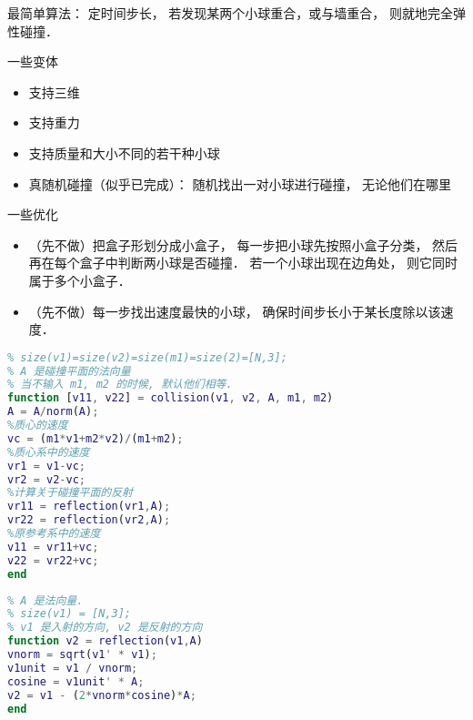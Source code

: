 
\begin{issues}
\issueDraft
\end{issues}


最简单算法： 定时间步长， 若发现某两个小球重合，或与墙重合， 则就地完全弹性碰撞．

一些变体
\begin{itemize}
\item 支持三维
\item 支持重力
\item 支持质量和大小不同的若干种小球
\item 真随机碰撞（似乎已完成）： 随机找出一对小球进行碰撞， 无论他们在哪里
\end{itemize}

一些优化
\begin{itemize}
\item （先不做）把盒子形划分成小盒子， 每一步把小球先按照小盒子分类， 然后再在每个盒子中判断两小球是否碰撞． 若一个小球出现在边角处， 则它同时属于多个小盒子．
\item （先不做）每一步找出速度最快的小球， 确保时间步长小于某长度除以该速度．
\end{itemize}

\begin{lstlisting}[language=matlab]
% 两个粒子的完全弹性碰撞
% size(v1)=size(v2)=size(m1)=size(2)=[N,3];
% A 是碰撞平面的法向量
% 当不输入 m1, m2 的时候, 默认他们相等.
function [v11, v22] = collision(v1, v2, A, m1, m2)
A = A/norm(A);
%质心的速度
vc = (m1*v1+m2*v2)/(m1+m2);
%质心系中的速度
vr1 = v1-vc;
vr2 = v2-vc;
%计算关于碰撞平面的反射
vr11 = reflection(vr1,A);
vr22 = reflection(vr2,A);
%原参考系中的速度
v11 = vr11+vc;
v22 = vr22+vc;
end
\end{lstlisting}

\begin{lstlisting}[language=matlab]
% 反射
% A 是法向量. 
% size(v1) = [N,3];
% v1 是入射的方向, v2 是反射的方向
function v2 = reflection(v1,A)
vnorm = sqrt(v1' * v1);
v1unit = v1 / vnorm;
cosine = v1unit' * A;
v2 = v1 - (2*vnorm*cosine)*A;
end
\end{lstlisting}
